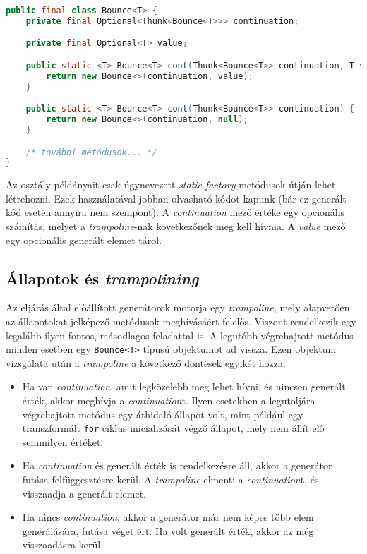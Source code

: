\begin{lstlisting}[language=Java, caption={A \texttt{Bounce<T>} osztály legfontosabb mezői és metódusai}, captionpos=b, label=JavaBounce, escapechar=$]
public final class Bounce<T> {
    private final Optional<Thunk<Bounce<T>>> continuation;

    private final Optional<T> value;

    public static <T> Bounce<T> cont(Thunk<Bounce<T>> continuation, T value) {
        return new Bounce<>(continuation, value);
    }

    public static <T> Bounce<T> cont(Thunk<Bounce<T>> continuation) {
        return new Bounce<>(continuation, null);
    }

    /* további metódusok... */
}
\end{lstlisting}    

Az osztály példányait csak úgynevezett \textit{static factory} metódusok útján lehet létrehozni. Ezek használatával jobban olvasható kódot kapunk (bár ez generált kód esetén annyira nem szempont). A \textit{continuation} mező értéke egy opcionális számítás, melyet a \textit{trampoline}-nak következőnek meg kell hívnia. A \textit{value} mező egy opcionális generált elemet tárol. 

\subsection{Állapotok és \textit{trampolining}}

Az eljárás által előállított generátorok motorja egy \textit{trampoline}, mely alapvetően az állapotokat jelképező metódusok meghívásáért felelős. Viszont rendelkezik egy legalább ilyen fontos, másodlagos feladattal is. A legutóbb végrehajtott metódus minden esetben egy \texttt{Bounce<T>} típusú objektumot ad vissza. Ezen objektum vizsgálata után a \textit{trampoline} a következő döntések egyikét hozza:

\begin{itemize}
    \item Ha van \textit{continuation}, amit legközelebb meg lehet hívni, és nincsen generált érték, akkor meghívja a \textit{continuation}t. Ilyen esetekben a legutoljára végrehajtott metódus egy áthidaló állapot volt, mint például egy transzformált \texttt{for} ciklus inicializását végző állapot, mely nem állít elő semmilyen értéket.
    \item Ha \textit{continuation} és generált érték is rendelkezésre áll, akkor a generátor futása felfüggesztésre kerül. A \textit{trampoline} elmenti a \textit{continuation}t, és visszaadja a generált elemet.
    \item Ha nincs \textit{continuation}, akkor a generátor már nem képes több elem generálására, futása véget ért. Ha volt generált érték, akkor az még visszaadásra kerül.
\end{itemize}

